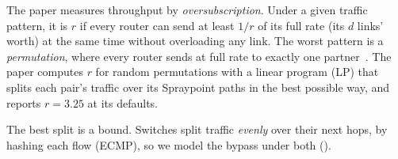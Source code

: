The paper measures throughput by \emph{oversubscription}. Under a given traffic pattern, it is $r$ if every router can send at least $1/r$ of its full rate (its $d$ links' worth) at the same time without overloading any link. The worst pattern is a \emph{permutation}, where every router sends at full rate to exactly one partner~\cite{namyar}. The paper computes $r$ for random permutations with a linear program (LP) that splits each pair's traffic over its Spraypoint paths in the best possible way, and reports $r = 3.25$ at its defaults.

The best split is a bound. Switches split traffic \emph{evenly} over their next hops, by hashing each flow (ECMP), so we model the bypass under both ().

